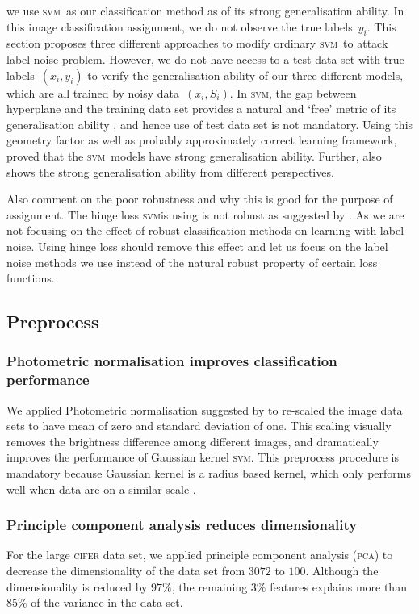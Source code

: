 \documentclass[12pt]{article} %
\newcommand{\svm}{\textsc{svm}}
\begin{document}
we use \svm\ as our classification method as of its strong generalisation ability. In this image classification assignment, we do not observe the true  labels~$y_i$. This section proposes three different approaches to modify ordinary \svm\ to attack label noise problem. However, we do not have access to a test data set with true labels~$(x_i,y_i)$ to verify the generalisation ability of our three different models, which are all trained by noisy data~$(x_i,S_i)$. In \svm , the gap between hyperplane and the training data set provides a natural and `free' metric of its generalisation ability  \citep{hastie01statisticallearning}, and hence use of test data set is not mandatory. Using this geometry factor as well as probably approximately correct learning framework,  \citet{NIPS2012_4500} proved that the  \svm\ models have strong generalisation ability. Further,  \citep{Cortes1995,Seeger:2003:PGE:944919.944929} also shows the strong generalisation ability from different perspectives.

{\color{red}Also comment on the poor robustness and why this is good for the purpose of assignment.}
The hinge loss \svm is using is not robust as suggested by \citet{Fernandez-Delgado:2014:WNH:2627435.2697065}. As we are not focusing on the effect of robust classification methods on learning with label noise. Using hinge loss should remove this effect and let us focus on the label noise methods we use instead of the natural robust property of certain loss functions.

\subsection{Preprocess}\label{preproc}
\subsubsection{Photometric normalisation improves classification performance}
We applied Photometric normalisation suggested by \citet{jonsson2002support} to re-scaled the image data sets to have mean of zero and standard deviation of one. This scaling visually removes the brightness difference among different images, and dramatically improves the performance of Gaussian kernel \svm . This preprocess procedure is mandatory because Gaussian kernel is a radius based kernel, which only performs well when data are on a similar scale \citep{jonsson2002support}. 

\subsubsection{Principle component analysis reduces dimensionality}
For the large \textsc{cifer} data set, we applied principle component analysis (\textsc{pca}) to decrease the dimensionality of the data set from $3072$ to $100$. Although the dimensionality is reduced by $97\%$, the remaining $3\%$ features explains more than $85\%$ of the variance in the data set. 
\end{document}
